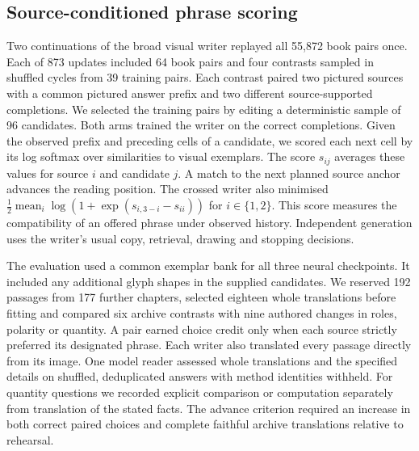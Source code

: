 \subsection*{Source-conditioned phrase scoring}
Two continuations of the broad visual writer replayed all 55,872 book pairs once. Each of 873 updates included 64 book pairs and four contrasts sampled in shuffled cycles from 39 training pairs. Each contrast paired two pictured sources with a common pictured answer prefix and two different source-supported completions. We selected the training pairs by editing a deterministic sample of 96 candidates. Both arms trained the writer on the correct completions. Given the observed prefix and preceding cells of a candidate, we scored each next cell by its log softmax over similarities to visual exemplars. The score $s_{ij}$ averages these values for source $i$ and candidate $j$. A match to the next planned source anchor advances the reading position. The crossed writer also minimised $\tfrac{1}{2}\operatorname{mean}_i\log(1+\exp(s_{i,3-i}-s_{ii}))$ for $i\in\{1,2\}$. This score measures the compatibility of an offered phrase under observed history. Independent generation uses the writer's usual copy, retrieval, drawing and stopping decisions.

The evaluation used a common exemplar bank for all three neural checkpoints. It included any additional glyph shapes in the supplied candidates. We reserved 192 passages from 177 further chapters, selected eighteen whole translations before fitting and compared six archive contrasts with nine authored changes in roles, polarity or quantity. A pair earned choice credit only when each source strictly preferred its designated phrase. Each writer also translated every passage directly from its image. One model reader assessed whole translations and the specified details on shuffled, deduplicated answers with method identities withheld. For quantity questions we recorded explicit comparison or computation separately from translation of the stated facts. The advance criterion required an increase in both correct paired choices and complete faithful archive translations relative to rehearsal.
